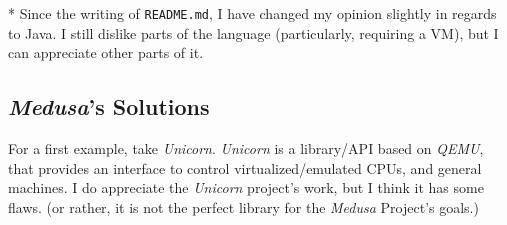 \documentclass{article}
\begin{document}
	* Since the writing of \texttt{README.md}, I have changed my opinion slightly
	in regards to Java. I still dislike parts of the language (particularly,
	requiring a VM), but I can appreciate other parts of it.

	\subsection{\textit{Medusa}'s Solutions}
	For a first example, take \textit{Unicorn}. \textit{Unicorn} is a
	library/API based on \textit{QEMU}, that provides an interface to control
	virtualized/emulated CPUs, and general machines. I do appreciate the
	\textit{Unicorn} project's work, but I think it has some flaws. (or rather,
	it is not the perfect library for the \textit{Medusa} Project's goals.)
\end{document}
